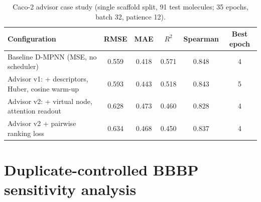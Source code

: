 \documentclass[10pt,a4paper]{article}
\renewcommand{\thetable}{S\arabic{table}}
\begin{document}
\begin{table}[H]
\renewcommand{\thetable}{S15}
\caption{Caco-2 advisor case study (single scaffold split, 91 test molecules; 35 epochs, batch 32, patience 12).}\label{tab:caco2}
\centering\footnotesize
\begin{tabular}{@{}lccccc@{}}
\toprule
Configuration & RMSE & MAE & $R^2$ & Spearman & Best epoch \\
\midrule
Baseline D-MPNN (MSE, no scheduler) & 0.559 & 0.418 & 0.571 & 0.848 & 4 \\
Advisor v1: + descriptors, Huber, cosine warm-up & 0.593 & 0.443 & 0.518 & 0.843 & 5 \\
Advisor v2: + virtual node, attention readout & 0.628 & 0.473 & 0.460 & 0.828 & 4 \\
Advisor v2 + pairwise ranking loss & 0.634 & 0.468 & 0.450 & 0.837 & 4 \\
\bottomrule
\end{tabular}
\end{table}

\section*{Duplicate-controlled BBBP sensitivity analysis}
\end{document}
